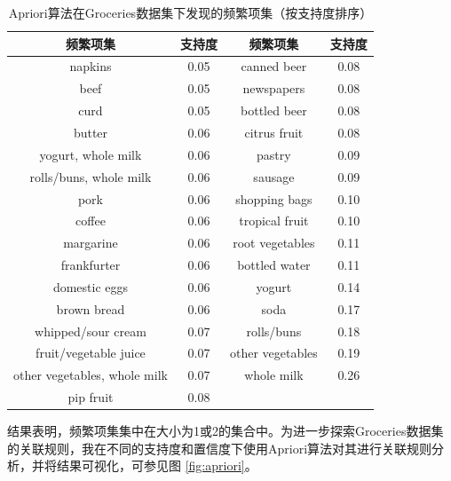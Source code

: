 \documentclass[12pt,a4paper]{article}
\theoremstyle{definition}
\begin{document}
\begin{table}[H]
	\renewcommand\arraystretch{1.35}
	\caption{Apriori算法在Groceries数据集下发现的频繁项集（按支持度排序）}
	\label{tab:apriori_gro_sup}
	\centering
	
	\begin{tabular}{c|c|c|c}
		\centering
		频繁项集 & 支持度 & 频繁项集 & 支持度 \\
		\hline
		napkins & 0.05 & canned beer & 0.08 \\
		beef & 0.05 & newspapers & 0.08 \\
		curd & 0.05 & bottled beer & 0.08 \\
		butter & 0.06 & citrus fruit & 0.08 \\
		yogurt, whole milk & 0.06 & pastry & 0.09 \\
		rolls/buns, whole milk & 0.06 & sausage & 0.09 \\
		pork & 0.06 & shopping bags & 0.10 \\
		coffee & 0.06 & tropical fruit & 0.10 \\
		margarine & 0.06 & root vegetables & 0.11 \\
		frankfurter & 0.06 & bottled water & 0.11 \\
		domestic eggs & 0.06 & yogurt & 0.14 \\
		brown bread & 0.06 & soda & 0.17 \\
		whipped/sour cream & 0.07 & rolls/buns & 0.18 \\
		fruit/vegetable juice & 0.07 & other vegetables & 0.19 \\
		other vegetables, whole milk & 0.07 & whole milk & 0.26 \\
		pip fruit & 0.08 & &
	\end{tabular}
\end{table}

结果表明，频繁项集集中在大小为1或2的集合中。为进一步探索Groceries数据集的关联规则，我在不同的支持度和置信度下使用Apriori算法对其进行关联规则分析，并将结果可视化，可参见图 \ref{fig:apriori}。
\end{document}
